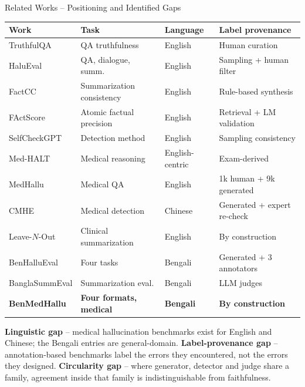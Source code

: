 \documentclass[aspectratio=169,11pt]{beamer}
\begin{document}
\begin{frame}[shrink=12]{Related Works \;--\; Positioning and Identified Gaps}
\vspace{-1mm}
\begin{center}
{\footnotesize
\begin{tabular}{@{}lllp{34mm}@{}}
\toprule
\textbf{Work} & \textbf{Task} & \textbf{Language} & \textbf{Label provenance}\\
\midrule
TruthfulQA & QA truthfulness & English & Human curation\\
HaluEval & QA, dialogue, summ. & English & Sampling + human filter\\
FactCC & Summarization consistency & English & Rule-based synthesis\\
FActScore & Atomic factual precision & English & Retrieval + LM validation\\
SelfCheckGPT & Detection method & English & Sampling consistency\\
Med-HALT & Medical reasoning & English-centric & Exam-derived\\
MedHallu & Medical QA & English & 1k human + 9k generated\\
CMHE & Medical detection & Chinese & Generated + expert re-check\\
Leave-$N$-Out & Clinical summarization & English & By construction\\
BenHalluEval & Four tasks & Bengali & Generated + 3 annotators\\
BanglaSummEval & Summarization eval. & Bengali & LLM judges\\
\midrule
\textbf{BenMedHallu} & \textbf{Four formats, medical} & \textbf{Bengali} & \textbf{By construction}\\
\bottomrule
\end{tabular}}
\end{center}
\vspace{2mm}
{\footnotesize
\textbf{Linguistic gap} -- medical hallucination benchmarks exist for English and Chinese; the Bengali entries are general-domain.\quad
\textbf{Label-provenance gap} -- annotation-based benchmarks label the errors they encountered, not the errors they designed.\quad
\textbf{Circularity gap} -- where generator, detector and judge share a family, agreement inside that family is indistinguishable from faithfulness.
}
\end{frame}
\end{document}
